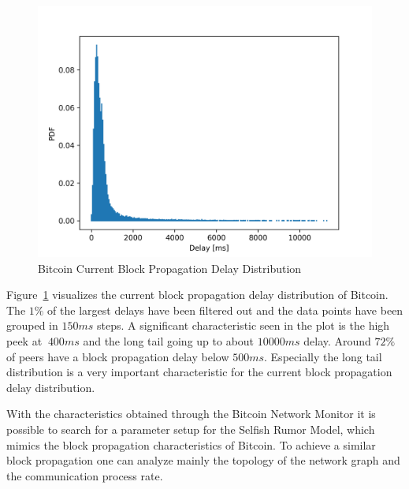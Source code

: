 \begin{figure}[ht]
	\includegraphics[width=\textwidth]{figures/bitcoin_current_block_propagation_delay_distribution.png}
	\caption{Bitcoin Current Block Propagation Delay Distribution \cite{BitcoinNetworkMonitor}}
	\label{fig:blockdelaydis}
\end{figure}
Figure~\ref{fig:blockdelaydis} visualizes the current block propagation delay distribution of Bitcoin. The $1\% $ of the largest delays have been filtered out and the data points have been grouped in $150ms$ steps. A significant characteristic seen in the plot is the high peek at $~400ms$ and the long tail going up to about $10000ms$ delay. Around $72\% $ of peers have a block propagation delay below $500ms$. Especially the long tail distribution is a very important characteristic for the current block propagation delay distribution.

With the characteristics obtained through the Bitcoin Network Monitor it is possible to search for a parameter setup for the Selfish Rumor Model, which mimics the block propagation characteristics of Bitcoin.
To achieve a similar block propagation one can analyze mainly the topology of the network graph and the communication process rate.

